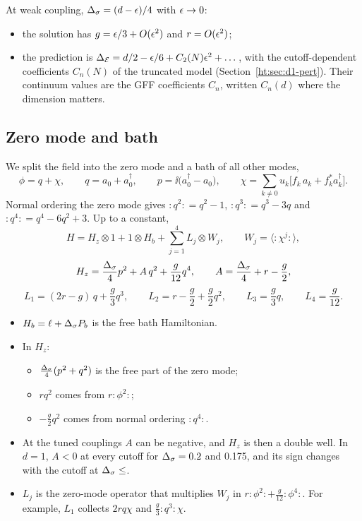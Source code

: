 At weak coupling, $\Delta_\sigma=(d-\epsilon)/4$ with $\epsilon\to0$:
\begin{itemize}
\item the solution has $g=\epsilon/3+O(\epsilon^2)$ and $r=O(\epsilon^2)$;
\item the prediction is $\Delta_{\mathcal E}=d/2-\epsilon/6+C_2(N)\epsilon^2+\dots$, with the cutoff-dependent coefficients $C_n(N)$ of the
 truncated model (Section~\ref{ht:sec:d1-pert}). Their continuum values are the GFF coefficients $C_n$, written $C_n(d)$
 where the dimension matters.
\end{itemize}

\subsection{Zero mode and bath}\label{ht:sec:split}
We split the field into the zero mode and a bath of all other modes,
\begin{equation}
 \phi=q+\chi,\qquad q=a_0+a_0^\dagger,\qquad p=\ii\big(a_0^\dagger-a_0\big),\qquad
 \chi=\sum_{k\neq0}u_k\big[f_k\,a_k+f_k^*a_k^\dagger\big].
 \label{ht:eq:split}
\end{equation}
Normal ordering the zero mode gives ${:}q^2{:}=q^2-1$, ${:}q^3{:}=q^3-3q$ and ${:}q^4{:}=q^4-6q^2+3$. Up to a
constant,
\begin{equation}
 H=H_z\otimes1+1\otimes H_b+\sum_{j=1}^4L_j\otimes W_j,\qquad W_j=\big\langle{:}\chi^j{:}\big\rangle ,
 \label{ht:eq:Hsplit}
\end{equation}
\begin{equation}
 H_z=\frac{\Delta_\sigma}4p^2+A\,q^2+\frac g{12}q^4,\qquad A=\frac{\Delta_\sigma}4+r-\frac g2 ,
 \label{ht:eq:Hz}
\end{equation}
\begin{equation}
 L_1=(2r-g)\,q+\frac g3q^3,\qquad L_2=r-\frac g2+\frac g2q^2,\qquad L_3=\frac g3q,\qquad L_4=\frac g{12} .
 \label{ht:eq:Lj}
\end{equation}
\begin{itemize}
\item $H_b=\ell+\Delta_\sigma P_b$ is the free bath Hamiltonian.
\item In $H_z$:
 \begin{itemize}
 \item $\frac{\Delta_\sigma}4(p^2+q^2)$ is the free part of the zero mode;
 \item $r q^2$ comes from $r{:}\phi^2{:}$;
 \item $-\frac g2q^2$ comes from normal ordering ${:}q^4{:}$.
 \end{itemize}
\item At the tuned couplings $A$ can be negative, and $H_z$ is then a double well. In $d=1$, $A<0$ at every cutoff for
 $\Delta_\sigma=0.2$ and 0.175, and its sign changes with the cutoff at $\Ds\le\HTq{S12}$.
\item $L_j$ is the zero-mode operator that multiplies $W_j$ in $r{:}\phi^2{:}+\frac g{12}{:}\phi^4{:}$. For example,
 $L_1$ collects $2rq\chi$ and $\frac g3{:}q^3{:}\chi$.
\end{itemize}

